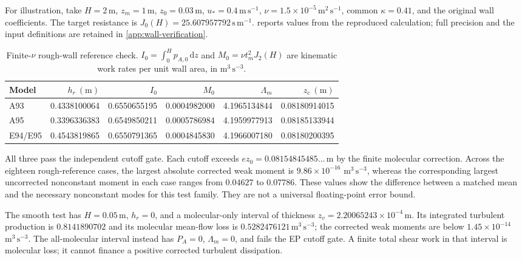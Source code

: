 \documentclass[11pt,a4paper]{article}
\numberwithin{equation}{section}
\newcommand{\ust}{u_*}
\newcommand{\dd}{\mathrm d}
\begin{document}
For illustration, take $H=2\,\mathrm m$, $z_m=1\,\mathrm m$,
$z_0=0.03\,\mathrm m$, $\ust=0.4\,\mathrm{m\,s^{-1}}$,
$\nu=1.5\times10^{-5}\,\mathrm{m^2\,s^{-1}}$, common
$\kappa=0.41$, and the original wall coefficients.  The target
resistance is $J_0(H)=25.607957792\,\mathrm{s\,m^{-1}}$.
 reports values from the reproduced
calculation; full precision and the input definitions are retained
in \cref{app:wall-verification}.
\begin{table}[htbp]
\centering\small
\caption{Finite-$\nu$ rough-wall reference check.  $I_0=\int_0^H
p_{A,0}\,\dd z$ and $M_0=\nu t_m^2J_2(H)$ are kinematic work
rates per unit wall area, in $\mathrm{m^3\,s^{-3}}$.}
\label{num:finite-wall-table}
\begin{tabular}{@{}lrrrrr@{}}
\toprule
Model & $h_r\ (\mathrm m)$ & $I_0$ & $M_0$ & $\Lambda_m$ & $z_c\ (\mathrm m)$\\
\midrule
A93 & 0.4338100064 & 0.6550655195 & 0.0004982000 & 4.1965134844 & 0.08180914015\\
A95 & 0.3396336383 & 0.6549850211 & 0.0005786984 & 4.1959977913 & 0.08185133944\\
E94/E95 & 0.4543819865 & 0.6550791365 & 0.0004845830 & 4.1966007180 & 0.08180200395\\
\bottomrule
\end{tabular}
\end{table}

All three pass the independent cutoff gate.  Each cutoff exceeds
$e z_0=0.08154845485\ldots\,\mathrm m$ by the finite molecular
correction.  Across the eighteen rough-reference cases, the largest
absolute corrected weak moment is $9.86\times10^{-16}$ $\mathrm{m^3\,s^{-3}}$, whereas the corresponding largest
uncorrected nonconstant moment in each case ranges from $0.04627$
to $0.07786$.  These values show the difference between a matched
mean and the necessary nonconstant modes for this test family.
They are not a universal floating-point error bound.

The smooth test has $H=0.05\,\mathrm m$, $h_r=0$, and a
molecular-only interval of thickness
$z_v=2.20065243\times10^{-4}\,\mathrm m$.  Its integrated turbulent
production is $0.8141890702$ and its molecular mean-flow loss is
$0.5282476121\,\mathrm{m^3\,s^{-3}}$; the corrected weak moments
are below $1.45\times10^{-14}$ $\mathrm{m^3\,s^{-3}}$.  The
all-molecular interval instead has $P_A=0$, $\Lambda_m=0$, and
fails the EP cutoff gate.  A finite total shear work in that interval
is molecular loss; it cannot finance a positive corrected turbulent
dissipation.
\end{document}
